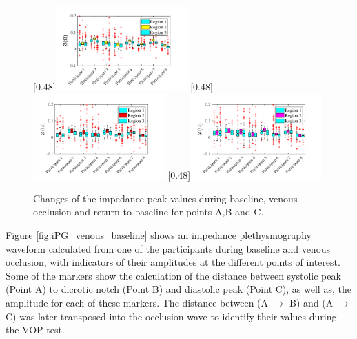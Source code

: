 \begin{figure}[!htbp]
	\null\hfill%
	[0.48\textwidth]{\includegraphics[width=0.45\textwidth, trim={0.5cm 0cm 1.5cm 0 cm}, clip]{figure_apa_3a}}%
	\hfill%
	[0.48\textwidth]{\includegraphics[width=0.45\textwidth, trim={0.5cm 0cm 1.5cm 0 cm}, clip]{figure_apa_3b}}%
	\hfill%
	[0.48\textwidth]{\includegraphics[width=0.45\textwidth, trim={0.5cm 0cm 1.5cm 0 cm}, clip]{figure_apa_3c}}%
	\null%
	\caption{Changes of the impedance peak values during baseline, venous occlusion and return to baseline for points A,B and C.}
	\label{fig:iPG change points venous}
\end{figure}

Figure \ref{fig:iPG_venous_baseline} shows an impedance plethysmography waveform calculated from one of the participants during baseline and venous occlusion, with indicators of their amplitudes at the different points of interest. Some of the markers show the calculation of the distance between systolic peak (Point A) to dicrotic notch (Point B) and diastolic peak (Point C), as well as, the amplitude for each of these markers. The distance between (A $\rightarrow$ B) and (A $\rightarrow$ C) was later transposed into the occlusion wave to identify their values during the VOP test.

